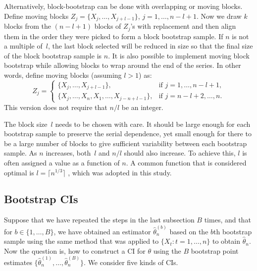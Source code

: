 \documentclass[12pt, letterpaper, titlepage]{article}
\begin{document}
Alternatively, block-bootstrap can be done with overlapping or moving blocks.
Define moving blocks $Z_j = \{X_j, \ldots, X_{j + l - 1}\}$,
$j = 1, \ldots, n - l + 1$. Now we draw $k$ blocks from the $(n - l + 1)$
blocks
of $Z_j$'s with replacement and then align them in the order they were
picked
to form a block bootstrap sample. If $n$ is not a multiple of~$l$, the last
block selected will be reduced in size so that the final size of the
block bootstrap sample is $n$. It is also possible to implement moving block
bootstrap while allowing blocks to wrap around the end of the series. In other
words, define moving blocks (assuming $l > 1$) as:
\begin{equation}
Z_j =
    \begin{cases}
        \{X_j, \ldots, X_{j + l - 1}\}, & \text{if } j = 1, \dots, n - l + 1,\\
        \{X_j, \ldots, X_n, X_1, \ldots, X_{j-n+l-1}\}, & \text{if } j = n - l
        + 2 ,\dots, n.
    \end{cases}
\end{equation}
This version does not require that $n/l$ be an integer.


The block size~$l$ needs to be chosen with care. It should be large enough for
each bootstrap sample to preserve the serial dependence, yet small enough for
there to be a large number of blocks to give sufficient variability between
each bootstrap sample. As $n$ increases, both~$l$
and $n / l$ should also increase. To achieve this, $l$ is
often assigned a value as a function of $n$. A common function that is
considered optimal is $l = \lceil n^{1/3} \rceil$
\citep{buhlmann1999block}, which was adopted in this study.

\subsection{Bootstrap CIs}

Suppose that we have repeated the steps in the last subsection $B$ times, and
that for $b \in \{1, \ldots, B\}$, we have obtained an estimator
$\hat\theta_n^{(b)}$ based on the $b$th bootstrap sample using the same method
that was applied to $\{X_t: t = 1, \ldots, n\}$ to obtain $\hat\theta_n$.
Now the question is, how to construct a CI for $\theta$
using the $B$ bootstrap point estimates
$\{\hat\theta_n^{(1)}, \ldots, \hat\theta_n^{(B)}\}$.
We consider five kinds of CIs.
\end{document}
